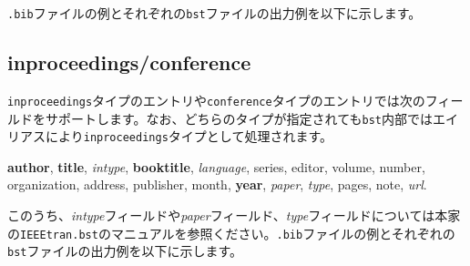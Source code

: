 \documentclass[10pt, a4paper]{jsarticle}
\renewcommand{\refname}{\small 参考文献}
\newcommand{\putlst}[1]{
  \noindent\makebox[\linewidth]{\rule{\linewidth}{0.4pt}}\vspace{-1.5zw}
  \vspace{-1.8zw}
  \noindent\makebox[\linewidth]{\rule{\linewidth}{0.4pt}}\vspace{0.5zw}\par
}
\begin{document}
\texttt{.bib}ファイルの例とそれぞれの\texttt{bst}ファイルの出力例を以下に示します。

\putlst{book.bib}

\begin{bibunit}[IEEJtran]
  \nocite{Book,jpBook1,jpBook2,enBook1}
  \renewcommand{\refname}{\small 参考文献(IEEJtran.bst)}
  {\small \putbib[book]}
\end{bibunit}
\begin{bibunit}[jIEEEtran]
  \nocite{Book,jpBook1,jpBook2,enBook1}
  \renewcommand{\refname}{\small 参考文献(jIEEEtran.bst)}
  {\small \putbib[book]}
\end{bibunit}
\begin{bibunit}[IEEJtran]
  \nocite{enjBook1/ej/jpjBook1}
  \renewcommand{\refname}{\small 英日を併記した参考文献(IEEJtran.bst)}
  {\small \putbib[book]}
\end{bibunit}
\begin{bibunit}[jIEEEtran]
  \nocite{enjBook1/ej/jpjBook1}
  \renewcommand{\refname}{\small 英日を併記した参考文献(jIEEEtran.bst)}
  {\small \putbib[book]}
\end{bibunit}


\subsection{inproceedings/conference}

\texttt{inproceedings}タイプのエントリや\texttt{conference}タイプのエントリでは次のフィールドをサポートします。なお、どちらのタイプが指定されても\texttt{bst}内部ではエイリアスにより\texttt{inproceedings}タイプとして処理されます。
\begin{center}
  \textbf{author}, \textbf{title}, \textsl{intype}, \textbf{booktitle}, \textsl{language}, series, editor, volume, number, \\
  organization, address, publisher, month, \textbf{year}, \textsl{paper}, \textsl{type}, pages, note, \textsl{url}.
\end{center}
このうち、\textsl{intype}フィールドや\textsl{paper}フィールド、\textsl{type}フィールドについては本家の\texttt{IEEEtran.bst}のマニュアルを参照ください。\texttt{.bib}ファイルの例とそれぞれの\texttt{bst}ファイルの出力例を以下に示します。

\putlst{inproceedings.bib}
\end{document}
